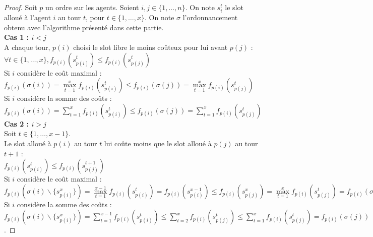 \documentclass[12pt]{article}
\theoremstyle{definition}
\begin{document}
\begin{proof}
Soit $p$ un ordre sur les agents. Soient $i, j \in \{1, \dots, n\}$. On note $s_i^t$ le slot alloué à l'agent $i$ au tour $t$, pour $t\in\{1,\dots,x\}$. On note $\sigma$ l'ordonnancement obtenu avec l'algorithme présenté dans cette partie.\\
\textbf{Cas 1 : $i<j$}\\
A chaque tour, $p(i)$ choisi le slot libre le moins coûteux pour lui avant $p(j)$ :\\
 $\forall t\in \{1, \dots, x\}, f_{p(i)}(s^t_{p(i)})\leq f_{p(i)}(s^t_{p(j)})$\\
 Si $i$ considère le coût maximal : $f_{p(i)}(\sigma(i)) = \max\limits_{t = 1}^x f_{p(i)}(s^t_{p(i)}) \leq f_{p(i)}(\sigma(j)) = \max\limits_{t = 1}^x f_{p(i)}(s^t_{p(j)})$\\
 Si $i$ considère la somme des coûts : $f_{p(i)}(\sigma(i)) = \sum\limits_{t = 1}^x f_{p(i)}(s^t_{p(i)})\leq f_{p(i)}(\sigma(j)) = \sum\limits_{t = 1}^x f_{p(i)}(s^t_{p(j)})$\\
\textbf{Cas 2 : $i>j$}\\
Soit $t\in\{1,\dots,x-1\}$.\\
Le slot alloué à $p(i)$ au tour $t$ lui coûte moins que le slot alloué à $p(j)$ au tour $t+1$ : \\
$f_{p(i)}(s^t_{p(i)})\leq f_{p(i)}(s^{t+1}_{p(j)})$\\
Si $i$ considère le coût maximal : \\
$f_{p(i)}(\sigma(i)\backslash\{s_{p(i)}^x\}) = \max\limits_{t = 1}^{x-1} f_{p(i)}(s^t_{p(i)}) = f_{p(i)}(s^{x-1}_{p(i)}) \leq f_{p(i)}(s^x_{p(j)}) = \max\limits_{t = 1}^{x} f_{p(i)}(s^t_{p(j)}) = f_{p(i)}(\sigma(j))$\\
Si $i$ considère la somme des coûts : \\
$f_{p(i)}(\sigma(i)\backslash\{s_{p(i)}^x\}) = \sum\limits_{t = 1}^{x-1} f_{p(i)}(s^t_{p(i)}) \leq \sum\limits_{t = 2}^{x} f_{p(i)}(s^t_{p(j)}) \leq \sum\limits_{t = 1}^{x} f_{p(i)}(s^t_{p(j)}) = f_{p(i)}(\sigma(j))$.
\end{proof}
\end{document}
